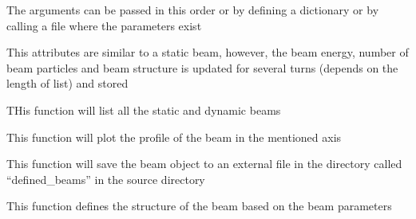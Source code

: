 \documentclass[letterpaper,10pt,english]{sphinxmanual}
\begin{document}
The arguments can be passed in this order or by defining a dictionary or by calling a file where the parameters exist

\begin{fulllineitems}
\label{beam:beam.dynamicbeam}
This attributes are similar to a static beam, however, the beam energy, number of beam particles and beam structure is updated for several turns (depends on the length of list) and stored

\begin{fulllineitems}
\label{beam:beam.dynamicbeam.listfiles}
THis function will list all the static and dynamic beams

\end{fulllineitems}


\begin{fulllineitems}
\label{beam:beam.dynamicbeam.plot}
This function will plot the profile of the beam in the mentioned axis

\end{fulllineitems}


\begin{fulllineitems}
\label{beam:beam.dynamicbeam.save}
This function will save the beam object to an external file in the directory called ``defined\_beams'' in the source directory

\end{fulllineitems}


\begin{fulllineitems}
\label{beam:beam.dynamicbeam.structure}
This function defines the structure of the beam based on the beam parameters

\end{fulllineitems}


\end{fulllineitems}
\end{document}
